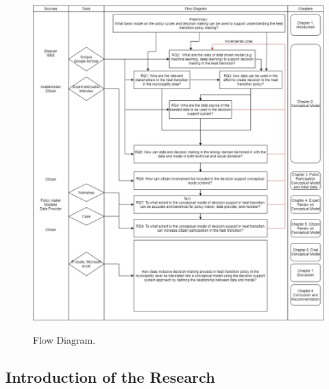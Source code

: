 \begin{figure}[htbp!]
  \caption{Flow Diagram.}
  \centering
  \includegraphics[width=1.2\textwidth]{Images/Flow.png}
   \label{fig:flow}
\end{figure}
 
\subsection{Introduction of the Research}


